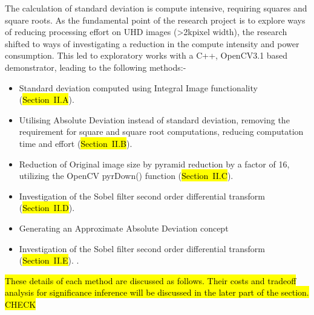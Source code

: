 \documentclass[journal]{IEEEtran}
\begin{document}

The calculation of standard deviation is compute intensive, requiring squares and square roots. As the fundamental point of the research project is to explore ways of reducing processing effort on UHD images (\textgreater 2kpixel width), the research shifted to ways of investigating a reduction in the compute intensity and power consumption.
This led to exploratory works with a C++, OpenCV3.1 based demonstrator, leading to the following methods:- \begin{itemize}
\item Standard deviation computed using Integral Image functionality (\hl{Section~II.A}).
\item Utilising Absolute Deviation instead of standard deviation, removing the requirement for square and square root computations, reducing computation time and effort (\hl{Section~II.B}).
\item Reduction of Original image size by pyramid reduction by a factor of 16, utilizing the OpenCV pyrDown() function (\hl{Section~II.C}).
\item Investigation of the Sobel filter second order differential transform \cite{Nguyen2014} (\hl{Section~II.D}).
\item Generating an Approximate Absolute Deviation concept \item Investigation of the Sobel filter second order differential transform \cite{Nguyen2014} (\hl{Section~II.E}).
.
\end{itemize}
\hl{These details of each method are discussed as follows. Their costs and tradeoff analysis for significance inference will be discussed in the later part of the section. CHECK}
\end{document}
